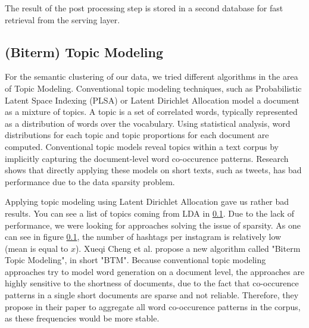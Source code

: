 The result of the post processing step is stored in a second database for fast retrieval from the serving layer.

\subsection{(Biterm) Topic Modeling}

For the semantic clustering of our data, we tried different algorithms in the area of Topic Modeling. Conventional topic modeling techniques, such as Probabilistic Latent Space Indexing (PLSA) \cite{Hofmann99probabilisticlatent} or Latent Dirichlet Allocation \cite{lda} model a document as a mixture of topics. A topic is a set of correlated words, typically represented as a distribution of words over the vocabulary. Using statistical analysis, word distributions for each topic and topic proportions for each document are computed. Conventional topic models reveal topics within a text corpus by implicitly capturing the document-level word co-occurence patterns. Research shows \cite{btm} that directly applying these models on short texts, such as tweets, has bad performance due to the data sparsity problem.

Applying topic modeling using Latent Dirichlet Allocation gave us rather bad results. You can see a list of topics coming from LDA in \ref{}. Due to the lack of performance, we were looking for approaches solving the issue of sparsity. As one can see in figure \ref{}, the number of hashtags per instagram is relatively low (mean is equal to $x$). Xueqi Cheng et al. \cite{btm} propose a new algorithm called "Biterm Topic Modeling", in short "BTM". Because conventional topic modeling approaches try to model word generation on a document level, the approaches are highly sensitive to the shortness of documents, due to the fact that co-occurence patterns in a single short documents are sparse and not reliable. Therefore, they propose in their paper to aggregate all word co-occurence patterns in the corpus, as these frequencies would be more stable.

